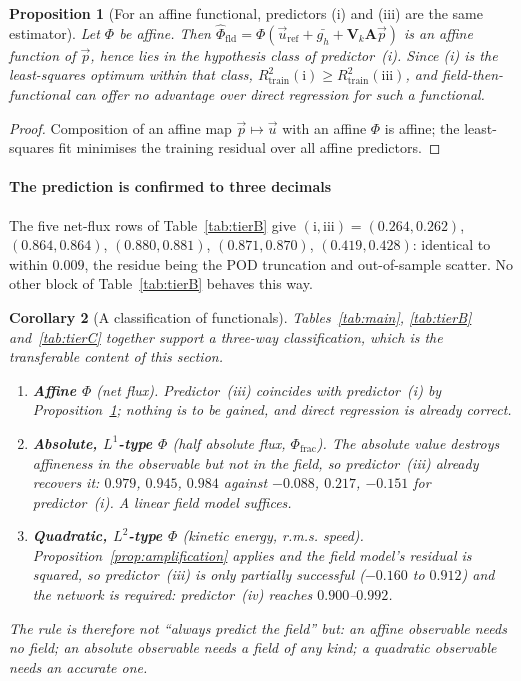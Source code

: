 \documentclass[11pt,a4paper]{article}
\newcommand{\vect}[1]{\mathbf{#1}}
\theoremstyle{plain}
\newtheorem{proposition}{Proposition}
\newtheorem{corollary}[proposition]{Corollary}
\theoremstyle{definition}
\theoremstyle{remark}
\begin{document}
\begin{proposition}[For an affine functional, predictors (i) and (iii) are the same estimator]
\label{prop:affine}
Let $\Phi$ be affine. Then
$\widehat{\Phi}_{\mathrm{fld}} = \Phi(\vec{u}_{\mathrm{ref}}+\bar{g_h}+\vect{V}_k\vect{A}\vec{p})$
is an affine function of $\vec{p}$, hence lies in the hypothesis class of
predictor~(i). Since (i) is the least-squares optimum within that class,
$R^2_{\mathrm{train}}(\mathrm{i}) \ge R^2_{\mathrm{train}}(\mathrm{iii})$, and
field-then-functional can offer no advantage over direct regression for such a
functional.
\end{proposition}

\begin{proof}
Composition of an affine map $\vec{p}\mapsto\vec{u}$ with an affine $\Phi$ is
affine; the least-squares fit minimises the training residual over all affine
predictors.
\end{proof}

\label{meas:affine-confirm}
\paragraph{The prediction is confirmed to three decimals}
The five net-flux rows of Table~\ref{tab:tierB} give
$(\mathrm{i},\mathrm{iii}) = (0.264,0.262)$, $(0.864,0.864)$, $(0.880,0.881)$,
$(0.871,0.870)$, $(0.419,0.428)$: identical to within $0.009$, the residue being
the POD truncation and out-of-sample scatter. No other block of
Table~\ref{tab:tierB} behaves this way.

\begin{corollary}[A classification of functionals]
\label{cor:classification}
Tables~\ref{tab:main}, \ref{tab:tierB} and~\ref{tab:tierC} together support a
three-way classification, which is the transferable content of this section.
\begin{enumerate}
\item \textbf{Affine $\Phi$} (net flux). Predictor~(iii) coincides with
predictor~(i) by Proposition~\ref{prop:affine}; nothing is to be gained, and
direct regression is already correct.
\item \textbf{Absolute, $L^1$-type $\Phi$} (half absolute flux,
$\Phi_{\mathrm{frac}}$). The absolute value destroys affineness in the
observable but not in the field, so predictor~(iii) already recovers it:
$0.979$, $0.945$, $0.984$ against $-0.088$, $0.217$, $-0.151$ for
predictor~(i). A \emph{linear} field model suffices.
\item \textbf{Quadratic, $L^2$-type $\Phi$} (kinetic energy, r.m.s. speed).
Proposition~\ref{prop:amplification} applies and the field model's residual is
squared, so predictor~(iii) is only partially successful ($-0.160$ to $0.912$)
and the network is required: predictor~(iv) reaches $0.900$--$0.992$.
\end{enumerate}
The rule is therefore not ``always predict the field'' but: \emph{an affine
observable needs no field; an absolute observable needs a field of any kind; a
quadratic observable needs an accurate one.}
\end{corollary}
\end{document}

